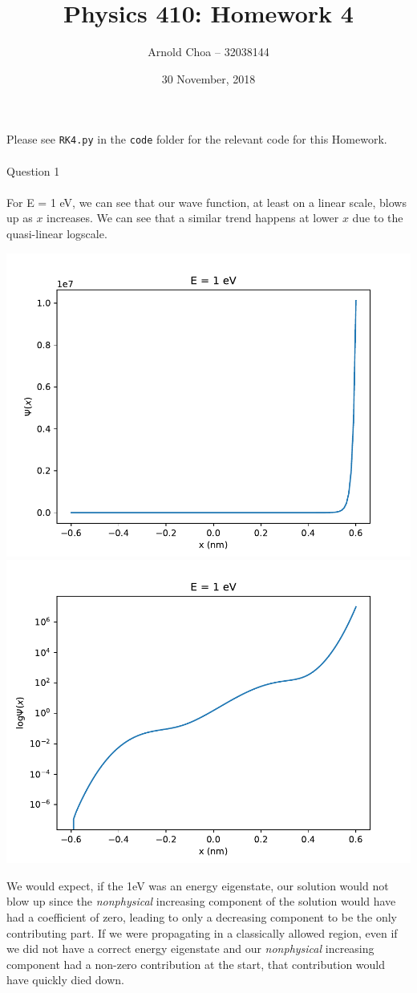 \documentclass[10pt]{article} %
\title{Physics 410: Homework 4}
\author{Arnold Choa -- 32038144}
\date{30 November, 2018} %
\begin{document}
\maketitle
\vspace{-0.5cm}
\noindent \normalsize{Please see \texttt{RK4.py} in the \texttt{code} folder for the relevant code for this Homework.}
\\ \\
\noindent \Large{Question 1}
\\ \\
\normalsize{For E = 1 eV, we can see that our wave function, at least on a linear scale, blows up as $x$ increases. We can see that a similar trend happens at lower $x$ due to the quasi-linear logscale.}
\begin{center}
\includegraphics[width=.45\textwidth]{../figs/q1_linscale.pdf}
\includegraphics[width=.45\textwidth]{../figs/q1_logscale.pdf}
\end{center}
\vspace{2em}
\noindent \normalsize{We would expect, if the 1eV was an energy eigenstate, our solution would not blow up since the \textit{nonphysical} increasing component of the solution would have had a coefficient of zero, leading to only a decreasing component to be the only contributing part. If we were propagating in a classically allowed region, even if we did not have a correct energy eigenstate and our \textit{nonphysical} increasing component had a non-zero contribution at the start, that contribution would have quickly died down.}
\end{document}

